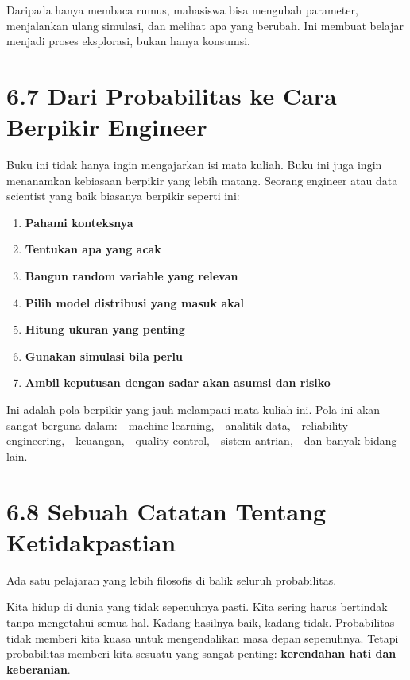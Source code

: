 \documentclass[
  letterpaper,
  DIV=11,
  numbers=noendperiod]{scrreprt}
\providecommand{\tightlist}{%
  \setlength{\itemsep}{0pt}\setlength{\parskip}{0pt}}
\begin{document}
Daripada hanya membaca rumus, mahasiswa bisa mengubah parameter,
menjalankan ulang simulasi, dan melihat apa yang berubah. Ini membuat
belajar menjadi proses eksplorasi, bukan hanya konsumsi.

\section{6.7 Dari Probabilitas ke Cara Berpikir
Engineer}\label{dari-probabilitas-ke-cara-berpikir-engineer}

Buku ini tidak hanya ingin mengajarkan isi mata kuliah. Buku ini juga
ingin menanamkan kebiasaan berpikir yang lebih matang. Seorang engineer
atau data scientist yang baik biasanya berpikir seperti ini:

\begin{enumerate}
\def\labelenumi{\arabic{enumi}.}
\tightlist
\item
  \textbf{Pahami konteksnya}
\item
  \textbf{Tentukan apa yang acak}
\item
  \textbf{Bangun random variable yang relevan}
\item
  \textbf{Pilih model distribusi yang masuk akal}
\item
  \textbf{Hitung ukuran yang penting}
\item
  \textbf{Gunakan simulasi bila perlu}
\item
  \textbf{Ambil keputusan dengan sadar akan asumsi dan risiko}
\end{enumerate}

Ini adalah pola berpikir yang jauh melampaui mata kuliah ini. Pola ini
akan sangat berguna dalam: - machine learning, - analitik data, -
reliability engineering, - keuangan, - quality control, - sistem
antrian, - dan banyak bidang lain.

\section{6.8 Sebuah Catatan Tentang
Ketidakpastian}\label{sebuah-catatan-tentang-ketidakpastian}

Ada satu pelajaran yang lebih filosofis di balik seluruh probabilitas.

Kita hidup di dunia yang tidak sepenuhnya pasti. Kita sering harus
bertindak tanpa mengetahui semua hal. Kadang hasilnya baik, kadang
tidak. Probabilitas tidak memberi kita kuasa untuk mengendalikan masa
depan sepenuhnya. Tetapi probabilitas memberi kita sesuatu yang sangat
penting: \textbf{kerendahan hati dan keberanian}.
\end{document}
